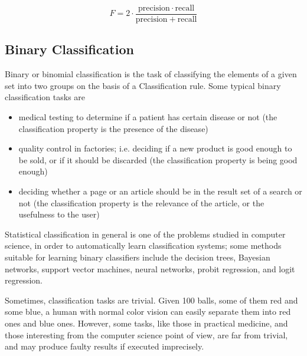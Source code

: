 \documentclass[a4paper,12pt]{article}
\begin{document}
\[ F = 2 \cdot \frac{\mathrm{precision} \cdot \mathrm{recall}}{\mathrm{precision} + \mathrm{recall}}\]

\newpage

\subsection{Binary Classification}

Binary or binomial classification is the task of classifying the elements of a given set into two groups on the basis of a Classification rule. Some typical binary classification tasks are

\begin{itemize}
	\item medical testing to determine if a patient has certain disease or not (the classification property is the presence of the disease)
	\item quality control in factories; i.e. deciding if a new product is good enough to be sold, or if it should be discarded (the classification property is being good enough)
	\item deciding whether a page or an article should be in the result set of a search or not (the classification property is the relevance of the article, or the usefulness to the user)
\end{itemize}
Statistical classification in general is one of the problems studied in computer science, in order to automatically learn classification systems; some methods suitable for learning binary classifiers include the decision trees, Bayesian networks, support vector machines, neural networks, probit regression, and logit regression.

Sometimes, classification tasks are trivial. Given 100 balls, some of them red and some blue, a human with normal color vision can easily separate them into red ones and blue ones. However, some tasks, like those in practical medicine, and those interesting from the computer science point of view, are far from trivial, and may produce faulty results if executed imprecisely.
\end{document}
